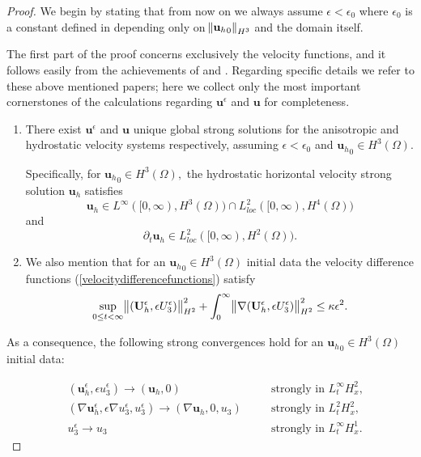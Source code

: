 \documentclass[11pt]{article}
\begin{document}
\begin{proof}

We begin by stating that from now on we always assume $\epsilon < \epsilon_0$ where $\epsilon_0$ is a constant defined in \cite{li2019primitive} depending only on $\norm{{\mathbf{u}_h}_0}_{H^3}$ and the domain itself.

The first part of the proof concerns exclusively the velocity functions, and it follows easily from the achievements of \cite{li2019primitive} and \cite{petcu2005sobolev}. Regarding specific details we refer to these above mentioned papers; here we collect only the most important cornerstones of the calculations regarding $\mathbf{u}^\epsilon$ and $\mathbf{u}$ for completeness.

\begin{enumerate}

\item There exist $\mathbf{u}^\epsilon$ and $\mathbf{u}$ unique global strong solutions for the anisotropic and hydrostatic velocity systems respectively, assuming $\epsilon < \epsilon_0$ and ${\mathbf{u}_h}_0 \in H^3(\Omega).$

Specifically, for ${\mathbf{u}_h}_0 \in H^3(\Omega),$ the hydrostatic horizontal velocity strong solution $\mathbf{u}_h$ satisfies
%
\begin{equation} \label{u_regularities_first}
\mathbf{u}_h \in L^\infty([0, \infty), H^3(\Omega)) \cap L^2_{loc}([0, \infty), H^4(\Omega))
\end{equation}
%
and
%
\begin{equation} \label{u_regularities_second}
\partial_t \mathbf{u}_h \in L^2_{loc}([0, \infty), H^2(\Omega)).
\end{equation}
%
\item We also mention that for an ${\mathbf{u}_h}_0 \in H^3(\Omega)$ initial data the velocity difference functions (\ref{velocitydifferencefunctions}) satisfy
%
\begin{equation} \label{UdifferenceEstimate}
\sup_{0 \leq t < \infty}{\norm{(\mathbf{U}_h^\epsilon, \epsilon U_3^\epsilon)}_{H^2}^2} + \int_0^\infty \norm{\nabla (\mathbf{U}_h^\epsilon, \epsilon U_3^\epsilon)}_{H^2}^2 \leq \kappa \epsilon^2.
\end{equation}

\end{enumerate}

As a consequence, the following strong convergences hold for an ${\mathbf{u}_h}_0 \in H^3(\Omega)$ initial data:

\begin{align}
& (\mathbf{u}_h^\epsilon, \epsilon u_3^\epsilon) \to (\mathbf{u}_h, 0) &\quad & \text{strongly in $L_t^\infty H_x^2$,} \label{StrongConvVelocity1} \\
& (\nabla \mathbf{u}_h^\epsilon, \epsilon \nabla u_3^\epsilon, u_3^\epsilon) \to (\nabla \mathbf{u}_h, 0, u_3) &\quad & \text{strongly in $L_t^2 H_x^2$,} \label{StrongConvVelocity2} \\ 
& u_3^\epsilon \to u_3 &\quad & \text{strongly in $L_t^\infty H_x^1.$} \label{StrongConvVelocity3}
\end{align}


\end{proof}
\end{document}
